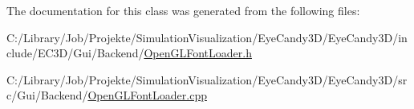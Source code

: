 The documentation for this class was generated from the following files\+:\begin{DoxyCompactItemize}
\item 
C\+:/\+Library/\+Job/\+Projekte/\+Simulation\+Visualization/\+Eye\+Candy3\+D/\+Eye\+Candy3\+D/include/\+E\+C3\+D/\+Gui/\+Backend/\mbox{\hyperlink{_open_g_l_font_loader_8h}{Open\+G\+L\+Font\+Loader.\+h}}\item 
C\+:/\+Library/\+Job/\+Projekte/\+Simulation\+Visualization/\+Eye\+Candy3\+D/\+Eye\+Candy3\+D/src/\+Gui/\+Backend/\mbox{\hyperlink{_open_g_l_font_loader_8cpp}{Open\+G\+L\+Font\+Loader.\+cpp}}\end{DoxyCompactItemize}
